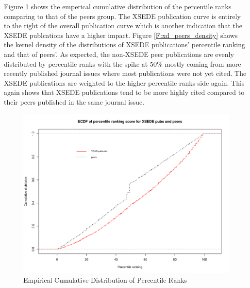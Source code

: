 \documentclass{sig-alternate}
\begin{document}
Figure \ref{F:ptranking_cdf} shows the emperical cumulative distribution of the
percentile ranks comparing to that of the peers group. The XSEDE publication curve is entirely to the right of the overall publication curve which is another indication that the XSEDE publcations have a higher impact.
Figure \ref{F:xd_peers_density} shows the kernel density of the distributions
of XSEDE publications' percentile ranking and that of peers'. As expected,
the non-XSEDE peer publications are evenly distributed by percentile
ranks with the spike at 50\% mostly coming from more recently published journal
issues where most publications were not yet cited. The XSEDE publications are
weighted to the higher percentile ranks side again. This again shows that XSEDE
publications tend to be more highly cited compared to their peers published in
the same journal issue.

\begin{figure}[htb!]
    \includegraphics[width=0.95\columnwidth]{images/ptranking_CDF.pdf}
    \caption{Empirical Cumulative Distribution of Percentile Ranks}
    \label{F:ptranking_cdf}
\end{figure}
\end{document}
